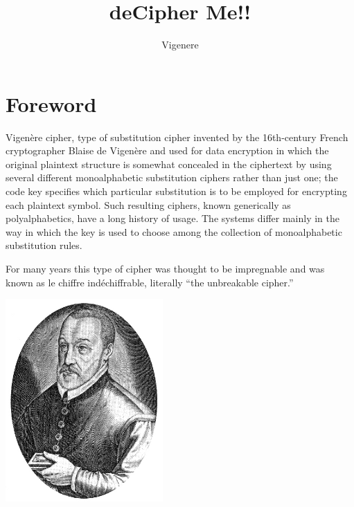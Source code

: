 \documentclass{42-en}
\begin{document}
    \title{deCipher Me!!}
    \subtitle{Vigenere}


\maketitle

\tableofcontents

\chapter{Foreword}

 Vigenère cipher, type of substitution cipher invented by the 16th-century French cryptographer Blaise de Vigenère and used for data encryption in which the original plaintext structure is somewhat concealed in the ciphertext by using several different monoalphabetic substitution ciphers rather than just one; the code key specifies which particular substitution is to be employed for encrypting each plaintext symbol. Such resulting ciphers, known generically as polyalphabetics, have a long history of usage. The systems differ mainly in the way in which the key is used to choose among the collection of monoalphabetic substitution rules.

For many years this type of cipher was thought to be impregnable and was known as le chiffre indéchiffrable, literally “the unbreakable cipher.”
   
    \begin{center}
        \includegraphics[width=0.45\textwidth]{vigenere.jpg}
    \end{center}
\end{document}
